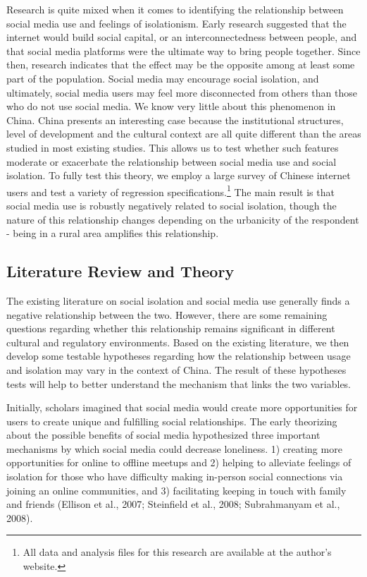 \documentclass[
  letterpaper,
  DIV=11,
  numbers=noendperiod]{scrartcl}
\begin{document}
Research is quite mixed when it comes to identifying the relationship
between social media use and feelings of isolationism. Early research
suggested that the internet would build social capital, or an
interconnectedness between people, and that social media platforms were
the ultimate way to bring people together. Since then, research
indicates that the effect may be the opposite among at least some part
of the population. Social media may encourage social isolation, and
ultimately, social media users may feel more disconnected from others
than those who do not use social media. We know very little about this
phenomenon in China. China presents an interesting case because the
institutional structures, level of development and the cultural context
are all quite different than the areas studied in most existing studies.
This allows us to test whether such features moderate or exacerbate the
relationship between social media use and social isolation. To fully
test this theory, we employ a large survey of Chinese internet users and
test a variety of regression specifications.\footnote{All data and
  analysis files for this research are available at the author's
  website.} The main result is that social media use is robustly
negatively related to social isolation, though the nature of this
relationship changes depending on the urbanicity of the respondent -
being in a rural area amplifies this relationship.

\hypertarget{literature-review-and-theory}{%
\subsection{Literature Review and
Theory}\label{literature-review-and-theory}}

The existing literature on social isolation and social media use
generally finds a negative relationship between the two. However, there
are some remaining questions regarding whether this relationship remains
significant in different cultural and regulatory environments. Based on
the existing literature, we then develop some testable hypotheses
regarding how the relationship between usage and isolation may vary in
the context of China. The result of these hypotheses tests will help to
better understand the mechanism that links the two variables.

Initially, scholars imagined that social media would create more
opportunities for users to create unique and fulfilling social
relationships. The early theorizing about the possible benefits of
social media hypothesized three important mechanisms by which social
media could decrease loneliness. 1) creating more opportunities for
online to offline meetups and 2) helping to alleviate feelings of
isolation for those who have difficulty making in-person social
connections via joining an online communities, and 3) facilitating
keeping in touch with family and friends (Ellison et al., 2007;
Steinfield et al., 2008; Subrahmanyam et al., 2008).
\end{document}
